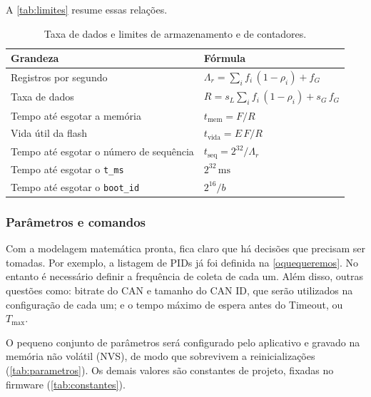 \documentclass[12pt]{article}
\begin{document}
A \autoref{tab:limites} resume essas relações.

\begin{table}[htbp]
  \centering
  \caption{Taxa de dados e limites de armazenamento e de contadores.}
  \label{tab:limites}
  \begin{tabular}{ll}
    \toprule
    Grandeza & Fórmula \\
    \midrule
    Registros por segundo & $\Lambda_r = \sum_i f_i\,(1-\rho_i) + f_G$ \\
    Taxa de dados & $R = s_L \sum_i f_i\,(1-\rho_i) + s_G\,f_G$ \\
    Tempo até esgotar a memória & $t_{\mathrm{mem}} = F/R$ \\
    Vida útil da flash & $t_{\mathrm{vida}} = E\,F/R$ \\
    Tempo até esgotar o número de sequência & $t_{\mathrm{seq}} = 2^{32}/\Lambda_r$ \\
    Tempo até esgotar o \texttt{t\_ms} & $2^{32}\,\si{\milli\second}$ \\
    Tempo até esgotar o \texttt{boot\_id} & $2^{16}/b$ \\
    \bottomrule
  \end{tabular}
\end{table}


\subsubsection{Parâmetros e comandos}
\label{sec:parametros}

Com a modelagem matemática pronta, fica claro que há decisões que precisam ser tomadas. Por exemplo, a listagem de PIDs já foi definida na \autoref{oquequeremos}. No entanto é necessário definir a frequência de coleta de cada um. Além disso, outras questões como: bitrate do CAN e tamanho do CAN ID, que serão utilizados na configuração de cada um; e o tempo máximo de espera antes do Timeout, ou $T_{\mathrm{max}}$.

O pequeno conjunto de parâmetros será configurado pelo aplicativo e gravado na memória não volátil (NVS), de modo que sobrevivem a reinicializações (\autoref{tab:parametros}). Os demais valores são constantes de projeto, fixadas no firmware (\autoref{tab:constantes}).
 
\end{document}
